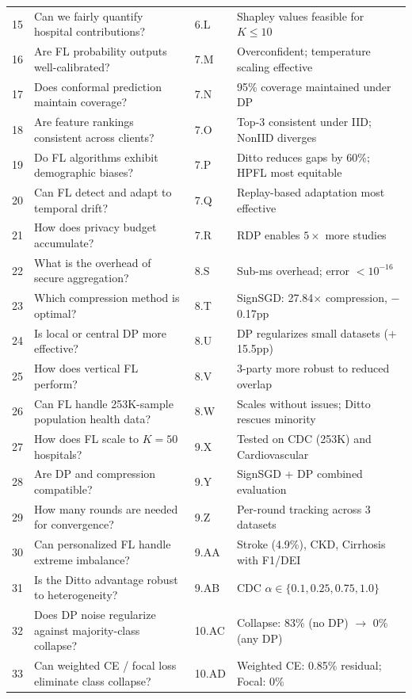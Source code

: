\documentclass[conference]{IEEEtran}
\begin{document}
\begin{table}[htbp]
{\begin{tabular}{clll}
15 & Can we fairly quantify hospital contributions? & 6.L & Shapley values feasible for $K \leq 10$ \\
16 & Are FL probability outputs well-calibrated? & 7.M & Overconfident; temperature scaling effective \\
17 & Does conformal prediction maintain coverage? & 7.N & 95\% coverage maintained under DP \\
18 & Are feature rankings consistent across clients? & 7.O & Top-3 consistent under IID; NonIID diverges \\
19 & Do FL algorithms exhibit demographic biases? & 7.P & Ditto reduces gaps by 60\%; HPFL most equitable \\
20 & Can FL detect and adapt to temporal drift? & 7.Q & Replay-based adaptation most effective \\
21 & How does privacy budget accumulate? & 7.R & RDP enables $5\times$ more studies \\
22 & What is the overhead of secure aggregation? & 8.S & Sub-ms overhead; error $<10^{-16}$ \\
23 & Which compression method is optimal? & 8.T & SignSGD: 27.84$\times$ compression, $-$0.17pp \\
24 & Is local or central DP more effective? & 8.U & DP regularizes small datasets ($+$15.5pp) \\
25 & How does vertical FL perform? & 8.V & 3-party more robust to reduced overlap \\
26 & Can FL handle 253K-sample population health data? & 8.W & Scales without issues; Ditto rescues minority \\
27 & How does FL scale to $K{=}50$ hospitals? & 9.X & Tested on CDC (253K) and Cardiovascular \\
28 & Are DP and compression compatible? & 9.Y & SignSGD + DP combined evaluation \\
29 & How many rounds are needed for convergence? & 9.Z & Per-round tracking across 3 datasets \\
30 & Can personalized FL handle extreme imbalance? & 9.AA & Stroke (4.9\%), CKD, Cirrhosis with F1/DEI \\
31 & Is the Ditto advantage robust to heterogeneity? & 9.AB & CDC $\alpha{\in}\{0.1, 0.25, 0.75, 1.0\}$ \\
\midrule
32 & Does DP noise regularize against majority-class collapse? & 10.AC & Collapse: 83\% (no DP) $\to$ 0\% (any DP) \\
33 & Can weighted CE / focal loss eliminate class collapse? & 10.AD & Weighted CE: 0.85\% residual; Focal: 0\% \\

\end{tabular}}
\end{table}
\end{document}
